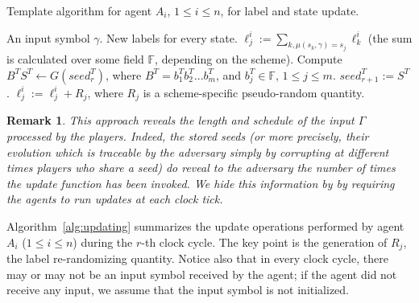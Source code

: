 \documentclass[letterpaper,11pt]{article}
\newcommand{\ignore}[1]{}
               {}
\newcommand{\seed}{\mathit{seed}}
\newtheorem{remark}[theorem]{Remark}
\begin{document}
\begin{algorithm*} [htb]
\caption{Template algorithm for agent $A_i$, $1\leq i \leq n$, for label 
and state update.\label{alg:updating}}
\label{algo:calc}
\begin{algorithmic}[1]
\REQUIRE An input symbol $\gamma$.
\ENSURE New labels for every state.
\STATE $ \ell ^i_j := \sum_{k, \mu(s_k, \gamma)=s_j} \ell^i_k$ (the sum is calculated over some field $\mathbb{F}$, depending on the scheme).
\ENDIF
{}
\STATE Compute  $B^T S^T \leftarrow G(\seed^T_r)$, where $B^T=b^T_1b^T_2...b^T_m$, and $b^T_j \in \mathbb {F}$, $1\le j \le m$.
\STATE $\seed^T_{r+1} := S^T$.
\STATE $\ell_j^i := \ell_j^i+ R_j$, where $R_j$ is a scheme-specific pseudo-random quantity.
\ENDFOR
\ENDFOR
\end{algorithmic}
\end{algorithm*}

\begin{remark}
{\em This approach reveals the length and schedule of the input
$\Gamma$ processed by the players.  Indeed, the stored seeds (or more
precisely, their evolution which is traceable by the adversary simply
by corrupting at different times players who share a seed) do reveal
to the adversary the number of times the update function has been invoked.
We hide this information by
by requiring the agents to run updates at each
clock tick.
} 
\end{remark}



Algorithm~\ref{alg:updating} 
summarizes the update operations performed by agent $A_i$ ($1\le i \le
n$) during the $r$-th clock cycle. The key point is the generation of
$R_j$, the label re-randomizing quantity. Notice also that in every
clock cycle, there may or may not be an input symbol received by the
agent; if the agent did not receive any input, we assume that the
input symbol is not initialized.



\ignore{

\todo{VLAD: I haven't gone through the algorithm. I suspect it needs some care.}

\todo{need to add text explaining that add-randomness does, depending on the instance of the protocol... what does it do?}

\todo{add-randomness is not a good name}

\todo{Juan: I tried to simplify the notation, and made add-randomness explicit. I'll probably change it further once I go over the next section.}

} 
\end{document}
